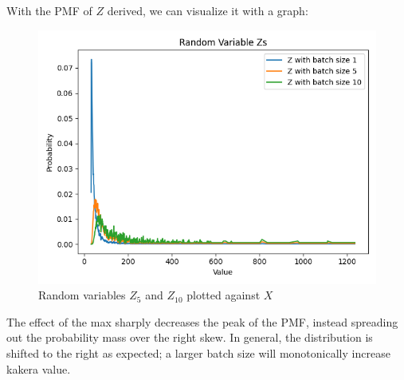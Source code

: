\documentclass[11pt, oneside]{article}
\theoremstyle{plain}
\theoremstyle{definition}
\begin{document}
With the PMF of \( Z \) derived, we can visualize it with a graph:
\begin{figure}[h!]
  \centering
  \includegraphics[scale=0.6]{graphs/random_variables/kakera_z.png}
  \caption{Random variables \( Z_5 \) and \( Z_{10} \) plotted against \( X \)}
\end{figure}

The effect of the max sharply decreases the peak of the PMF, instead
spreading out the probability mass over the right skew. In general,
the distribution is shifted to the right as expected; a larger batch
size will monotonically increase kakera value.
\end{document}
